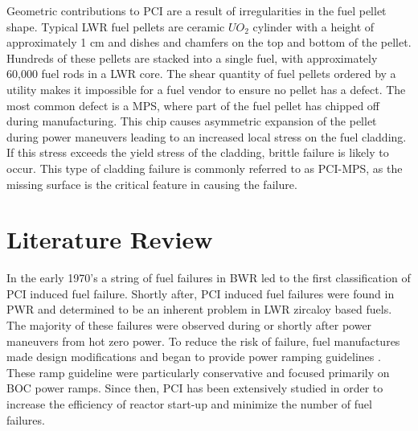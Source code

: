 \documentclass[edeposit,fullpage,12pt]{uiucthesis2009}
\begin{document}
Geometric contributions to \gls{PCI} are a result of irregularities in the fuel pellet shape.
Typical \gls{LWR} fuel pellets are ceramic $UO_2$ cylinder with a height of approximately 1 cm and dishes and chamfers on the top and bottom of the pellet.
Hundreds of these pellets are stacked into a single fuel, with approximately 60,000 fuel rods in a \gls{LWR} core.
The shear quantity of fuel pellets ordered by a utility makes it impossible for a fuel vendor to ensure no pellet has a defect.
The most common defect is a \gls{MPS}, where part of the fuel pellet has chipped off during manufacturing.
This chip causes asymmetric expansion of the pellet during power maneuvers leading to an increased local stress on the fuel cladding. 
If this stress exceeds the yield stress of the cladding, brittle failure is likely to occur.
This type of cladding failure is commonly referred to as \gls{PCI}-\gls{MPS}, as the missing surface is the critical feature in causing the failure.


\section{Literature Review}

In the early 1970's a string of fuel failures in \gls{BWR} led to the first classification of \gls{PCI} induced fuel failure.  
Shortly after, \gls{PCI} induced fuel failures were found in \gls{PWR} and determined to be an inherent problem in \gls{LWR} zircaloy based fuels. %
The majority of these failures were observed during or shortly after power maneuvers from hot zero power.
To reduce the risk of failure, fuel manufactures made design modifications and began to provide power ramping guidelines \cite{kennard_pci_2016}.
These ramp guideline were particularly conservative and focused primarily on \gls{BOC} power ramps. 
Since then, \gls{PCI} has been extensively studied in order to increase the efficiency of reactor start-up and minimize the number of fuel failures.
 
\end{document}
